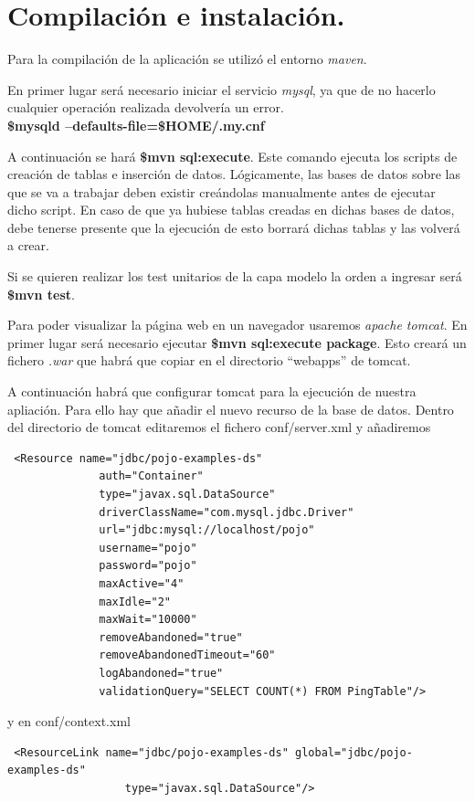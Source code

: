 \documentclass[12pt,a4paper,twoside,spanish]{article}      %
\begin{document}
\section{Compilación e instalación.}
Para la compilación de la aplicación se utilizó el entorno \textit{maven}.

En primer lugar será necesario iniciar el servicio \textit{mysql}, ya que de no hacerlo cualquier operación realizada devolvería un error.
\\	\textbf{\$mysqld --defaults-file=\$HOME/.my.cnf}
	
A continuación se hará \textbf{\$mvn sql:execute}. Este comando ejecuta los scripts de creación de tablas e inserción de datos. Lógicamente, las bases de datos sobre las que se va a trabajar deben existir creándolas manualmente antes de ejecutar dicho script. En caso de que ya hubiese tablas creadas en dichas bases de datos, debe tenerse presente que la ejecución de esto borrará dichas tablas y las volverá a crear.

Si se quieren realizar los test unitarios de la capa modelo la orden a ingresar será \textbf{\$mvn test}.

Para poder visualizar la página web en un navegador usaremos \textit{apache tomcat}. En primer lugar será necesario ejecutar \textbf{\$mvn sql:execute package}. Esto creará un fichero \textit{.war} que habrá que copiar en el directorio ``webapps'' de tomcat.

A continuación habrá que configurar tomcat para la ejecución de nuestra apliación. Para ello hay que añadir el nuevo recurso
de la base de datos. Dentro del directorio de tomcat editaremos el fichero conf/server.xml y añadiremos 
\begin{verbatim}
 <Resource name="jdbc/pojo-examples-ds"
              auth="Container"
              type="javax.sql.DataSource"
              driverClassName="com.mysql.jdbc.Driver"
              url="jdbc:mysql://localhost/pojo"
              username="pojo"
              password="pojo"
              maxActive="4"
              maxIdle="2"
              maxWait="10000"
              removeAbandoned="true"
              removeAbandonedTimeout="60"
              logAbandoned="true"
              validationQuery="SELECT COUNT(*) FROM PingTable"/>
\end{verbatim}

y en conf/context.xml
\begin{verbatim}
 <ResourceLink name="jdbc/pojo-examples-ds" global="jdbc/pojo-examples-ds"
                  type="javax.sql.DataSource"/>
\end{verbatim}
\end{document}
